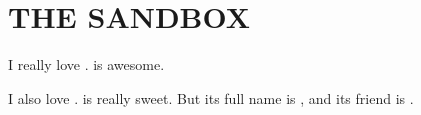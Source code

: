 \chapter{THE SANDBOX}
I really love .
 is awesome.

I also love .
 is really sweet.
But its full name is , and its friend is .
